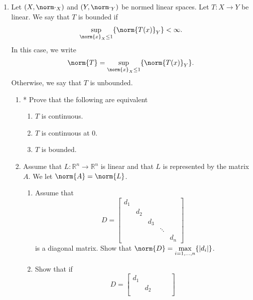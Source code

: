 \documentclass[notoc,notitlepage]{tufte-book}
\begin{document}
\begin{enumerate}
  \item Let $(X, \norm\cdot_X)$ and $(Y, \norm\cdot_Y)$ be normed linear spaces. Let $T : X \to Y$ be linear. We say that $T$ is bounded if
    \begin{equation*}
      \sup_{\norm{x}_X \leq 1} \{ \norm{ T(x) }_Y \} < \infty.
    \end{equation*}
    In this case, we write
    \begin{equation*}
      \norm{T} = \sup_{\norm{x}_X \leq 1} \{ \norm{T(x)}_Y \}.
    \end{equation*}
    Otherwise, we say that $T$ is unbounded.
    \begin{enumerate}
      \item * Prove that the following are equivalent
        \begin{enumerate}
          \item $T$ is continuous.
          \item $T$ is continuous at $0$.
          \item $T$ is bounded.
        \end{enumerate}
      \item Assume that $L : \mathbb{R}^n \to \mathbb{R}^n$ is linear and that $L$ is represented by the matrix $A$. We let $\norm{A} = \norm{L}$.
        \begin{enumerate}
          \item Assume that
            \begin{equation*}
              D = \begin{bmatrix}
                d_1  &     &     &        & \\
                     & d_2 &     &        & \\
                     &     & d_3 &        & \\
                     &     &     & \ddots & \\
                     &     &     &        & d_n
              \end{bmatrix}
            \end{equation*}
            is a diagonal matrix. Show that $\norm{D} = \max\limits_{i = 1, \ldots, n} \{ \abs{ d_i } \}$.
          \item Show that if
            \begin{equation*}
              D = \begin{bmatrix}
                d_1  &     &     &        & \\
                     & d_2 &     &        & \\

\end{bmatrix}
\end{equation*}
\end{enumerate}
\end{enumerate}
\end{enumerate}
\end{document}
